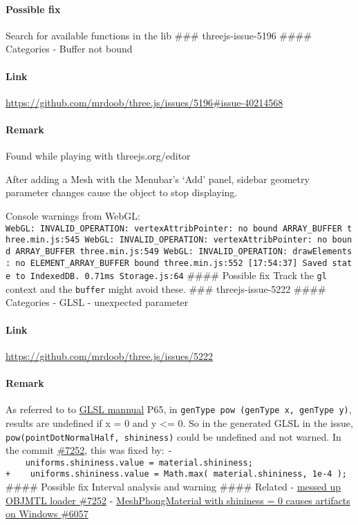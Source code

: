 \paragraph{Possible fix}\label{possible-fix-1}

Search for available functions in the lib \#\#\# threejs-issue-5196
\#\#\#\# Categories - Buffer not bound

\paragraph{Link}\label{link-4}

\url{https://github.com/mrdoob/three.js/issues/5196\#issue-40214568}

\paragraph{Remark}\label{remark-4}

Found while playing with threejs.org/editor

After adding a Mesh with the Menubar's `Add' panel, sidebar geometry
parameter changes cause the object to stop displaying.

Console warnings from WebGL:
\texttt{WebGL:\ INVALID\_OPERATION:\ vertexAttribPointer:\ no\ bound\ ARRAY\_BUFFER\ three.min.js:545\ WebGL:\ INVALID\_OPERATION:\ vertexAttribPointer:\ no\ bound\ ARRAY\_BUFFER\ three.min.js:549\ WebGL:\ INVALID\_OPERATION:\ drawElements:\ no\ ELEMENT\_ARRAY\_BUFFER\ bound\ three.min.js:552\ {[}17:54:37{]}\ Saved\ state\ to\ IndexedDB.\ 0.71ms\ Storage.js:64}
\#\#\#\# Possible fix Track the \texttt{gl} context and the
\texttt{buffer} might avoid these. \#\#\# threejs-issue-5222 \#\#\#\#
Categories - GLSL - unexpected parameter

\paragraph{Link}\label{link-5}

\url{https://github.com/mrdoob/three.js/issues/5222}

\paragraph{Remark}\label{remark-5}

As referred to to
\href{https://www.khronos.org/registry/gles/specs/2.0/GLSL_ES_Specification_1.0.17.pdf}{GLSL
mannual} P65, in \texttt{genType\ pow\ (genType\ x,\ genType\ y)},
results are undefined if x = 0 and y \textless{}= 0. So in the generated
GLSL in the issue, \texttt{pow(pointDotNormalHalf,\ shininess)} could be
undefined and not warned. In the commit
\href{https://github.com/mrdoob/three.js/commit/a13cf4343effc741b0aa333c37062cc7cc3d71c7}{\#7252},
this was fixed by:
\texttt{-\ \ \ \ uniforms.shininess.value\ =\ material.shininess;}
\texttt{+\ \ \ \ uniforms.shininess.value\ =\ Math.max(\ material.shininess,\ 1e-4\ );}
\#\#\#\# Possible fix Interval analysis and warning \#\#\#\# Related -
\href{https://github.com/mrdoob/three.js/issues/7252}{messed up OBJMTL
loader \#7252} -
\href{https://github.com/mrdoob/three.js/issues/6057}{MeshPhongMaterial
with shininess = 0 causes artifacts on Windows \#6057}

